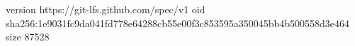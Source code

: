 version https://git-lfs.github.com/spec/v1
oid sha256:1e9031fc9da041fd778e64288cb55e00f3c853595a350045bb4b500558d3e464
size 87528
